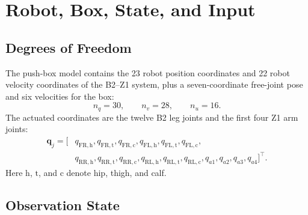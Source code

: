 \documentclass[11pt,a4paper]{article}
\begin{document}
\section{Robot, Box, State, and Input}

\subsection{Degrees of Freedom}

The push-box model contains the 23 robot position coordinates and 22 robot
velocity coordinates of the B2--Z1 system, plus a seven-coordinate free-joint
pose and six velocities for the box:
\begin{equation}
  n_q=30,\qquad n_v=28,\qquad n_u=16.
\end{equation}
The actuated coordinates are the twelve B2 leg joints and the first four Z1
arm joints:
\begin{align*}
\bm{q}_j = [&q_{\mathrm{FR,h}},q_{\mathrm{FR,t}},q_{\mathrm{FR,c}},
q_{\mathrm{FL,h}},q_{\mathrm{FL,t}},q_{\mathrm{FL,c}},\\
&q_{\mathrm{RR,h}},q_{\mathrm{RR,t}},q_{\mathrm{RR,c}},
q_{\mathrm{RL,h}},q_{\mathrm{RL,t}},q_{\mathrm{RL,c}},
q_{a1},q_{a2},q_{a3},q_{a4}]^\top .
\end{align*}
Here $\mathrm{h}$, $\mathrm{t}$, and $\mathrm{c}$ denote hip, thigh, and calf.

\subsection{Observation State}
\end{document}
